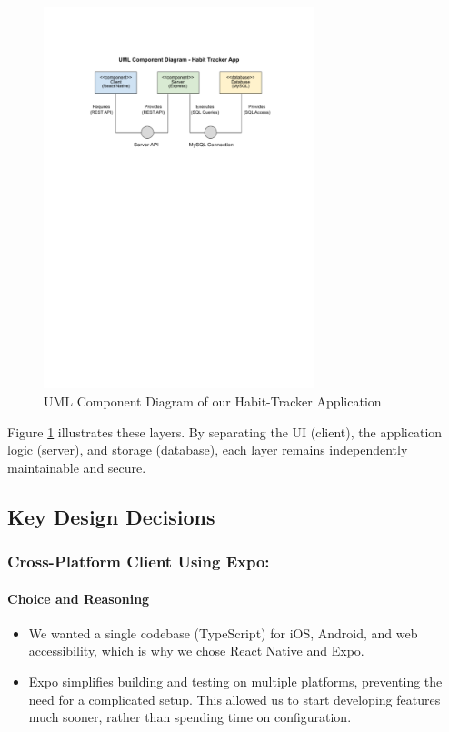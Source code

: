 \begin{figure}[H]
    \centering
    \includegraphics[width=0.7\textwidth]{resources/component.pdf}
    \caption{UML Component Diagram of our Habit-Tracker Application}
    \label{fig:component_diagram}
\end{figure}

Figure \ref{fig:component_diagram} illustrates these layers. By separating the UI (client), the application logic (server), and storage (database), each layer remains independently maintainable and secure.

\subsection{Key Design Decisions}

\subsubsection{Cross-Platform Client Using Expo:}

\paragraph{Choice and Reasoning} \begin{itemize} \item We wanted a single codebase (TypeScript) for iOS, Android, and web accessibility, which is why we chose React Native and Expo.
\item Expo simplifies building and testing on multiple platforms, preventing the need for a complicated setup. This allowed us to start developing features much sooner, rather than spending time on configuration.  \end{itemize}

